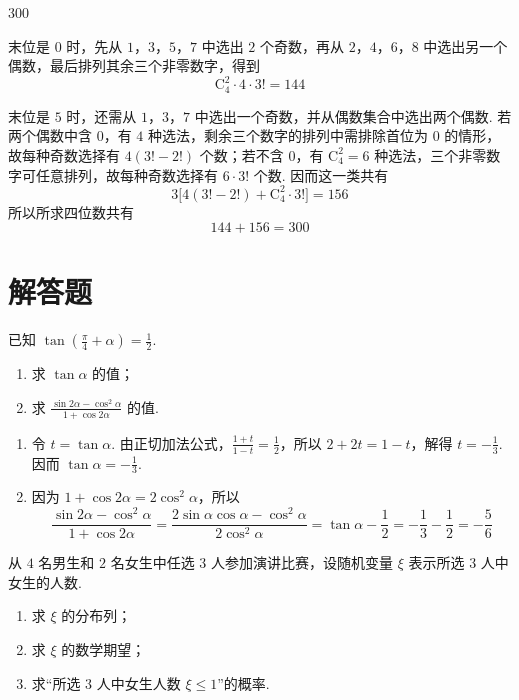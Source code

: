 \begin{answer}
300
\end{answer}

\begin{solution}
末位是 \(0\) 时，先从 \(1\)，\(3\)，\(5\)，\(7\) 中选出 \(2\) 个奇数，再从 \(2\)，\(4\)，\(6\)，\(8\) 中选出另一个偶数，最后排列其余三个非零数字，得到
\[
\mathrm C_4^2\cdot4\cdot3!=144
\]

末位是 \(5\) 时，还需从 \(1\)，\(3\)，\(7\) 中选出一个奇数，并从偶数集合中选出两个偶数. 若两个偶数中含 \(0\)，有 \(4\) 种选法，剩余三个数字的排列中需排除首位为 \(0\) 的情形，故每种奇数选择有 \(4(3!-2!)\) 个数；若不含 \(0\)，有 \(\mathrm C_4^2=6\) 种选法，三个非零数字可任意排列，故每种奇数选择有 \(6\cdot3!\) 个数. 因而这一类共有
\[
3\bigl[4(3!-2!)+\mathrm C_4^2\cdot3!\bigr]=156
\]
所以所求四位数共有
\[
144+156=300
\]
\end{solution}

\section{解答题}
\begin{problem}
已知 \(\tan \left(\frac{\pi}{4} + \alpha\right) = \frac{1}{2}\).

\begin{enumerate}
\item 求 \(\tan \alpha\) 的值；
\item 求 \(\frac{\sin 2\alpha - \cos^2\alpha}{1 + \cos 2\alpha}\) 的值.
\end{enumerate}
\end{problem}

\begin{solution}
\begin{enumerate}
\item 令 \(t=\tan\alpha\). 由正切加法公式，\(\frac{1+t}{1-t}=\frac12\)，所以 \(2+2t=1-t\)，解得 \(t=-\frac13\). 因而 \(\tan\alpha=-\frac13\).

\item 因为 \(1+\cos2\alpha=2\cos^2\alpha\)，所以
\[
\frac{\sin2\alpha-\cos^2\alpha}{1+\cos2\alpha}
=\frac{2\sin\alpha\cos\alpha-\cos^2\alpha}{2\cos^2\alpha}
=\tan\alpha-\frac12
=-\frac13-\frac12=-\frac56
\]
\end{enumerate}
\end{solution}

\begin{problem}
从 \(4\) 名男生和 \(2\) 名女生中任选 \(3\) 人参加演讲比赛，设随机变量 \(\xi\) 表示所选 \(3\) 人中女生的人数.

\begin{enumerate}
\item 求 \(\xi\) 的分布列；
\item 求 \(\xi\) 的数学期望；
\item 求“所选 \(3\) 人中女生人数 \(\xi \leqslant 1\)”的概率.
\end{enumerate}
\end{problem}

